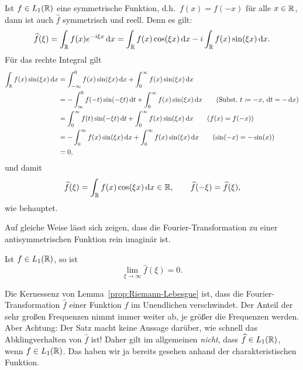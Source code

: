 \begin{remark}
Ist $ f \in L_{1}(\mathbb{R}) $ eine symmetrische Funktion, d.h.\ $ f(x) = f(-x) $ für alle $ x \in \mathbb{R} $, 
dann ist auch $ \widehat{f} $ symmetrisch und reell. Denn es gilt:
\[
   \widehat{f}(\xi)
 = \int_{\R} f(x) e^{-i\xi x} \dif x
 = \int_{\R} f(x) \cos(\xi x) \dif x - i \int_{\R} f(x) \sin(\xi x) \dif x.
\]
Für das rechte Integral gilt
\begin{align}
   \int_{\R} f(x) \sin(\xi x) \dif x \notag
&= \int_{-\infty}^{0} f(x) \sin(\xi x) \dif x + \int_{0}^{\infty} f(x) \sin(\xi x) \dif x 
     \notag \\
&= - \int_{\infty}^{0} f(-t) \sin(-\xi t) \dif t + \int_{0}^{\infty} f(x) \sin(\xi x) \dif x
     \tag{Subst.\ $ t \coloneqq -x $, $ \dif t = -\dif x $} \\
&= \int_{0}^{\infty} f(t) \sin(-\xi t) \dif t + \int_{0}^{\infty} f(x) \sin(\xi x) \dif x
     \tag{$ f(x) = f(-x) $} \\
&= - \int_{0}^{\infty} f(x) \sin(\xi x) \dif x + \int_{0}^{\infty} f(x) \sin(\xi x) \dif x
     \tag{$ \sin(-x) = -\sin(x) $} \\
&= 0 \notag,
\end{align}
und damit
\[
   \widehat{f}(\xi)
 = \int_{\R} f(x) \cos(\xi x) \dif x \in \R, \qquad
   \widehat{f}(- \xi) = \widehat{f}(\xi),
\]
wie behauptet.

Auf gleiche Weise lässt sich zeigen, dass die Fourier-Transformation zu einer antisymmetrischen 
Funktion rein imaginär ist.
\end{remark}

\begin{proposition}\label{prop:Riemann-Lebesgue}
Ist $ f \in L_{1}(\mathbb{R}) $, so ist
\[
  \lim\limits_{\xi \to \infty} \widehat{f}(\xi) = 0.
\]
\end{proposition}

\begin{remark}
Die Kernessenz von Lemma~\ref{prop:Riemann-Lebesgue} ist, dass die Fourier-Transformation 
$ \widehat{f} $ einer Funktion $ f $ im Unendlichen verschwindet. Der Anteil der sehr großen
Frequenzen nimmt immer weiter ab, je größer die Frequenzen werden. Aber Achtung: Der Satz macht
keine Aussage darüber, wie schnell das Abklingverhalten von $ \widehat{f} $ ist! Daher gilt im
allgemeinen \emph{nicht}, dass $ \widehat{f} \in L_{1}(\mathbb{R}) $, wenn $ f \in L_{1}(\mathbb{R}) $. Das haben
wir ja bereits gesehen anhand der charakteristischen Funktion.
\end{remark}

